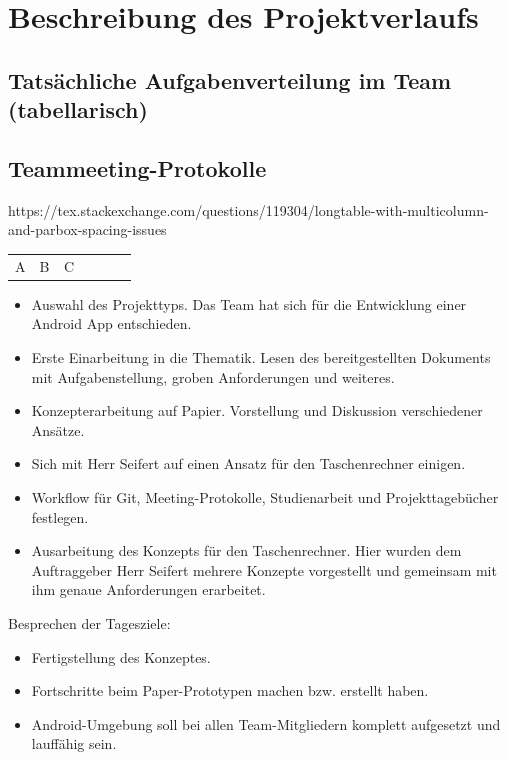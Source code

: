 \section{Beschreibung des Projektverlaufs}

\subsection{Tatsächliche Aufgabenverteilung im Team (tabellarisch)}

\subsection{Teammeeting-Protokolle}
https://tex.stackexchange.com/questions/119304/longtable-with-multicolumn-and-parbox-spacing-issues
\begin{longtable}
	{
		|p{0.2\linewidth}
		|p{0.2\linewidth}
		|p{0.6\linewidth}|
	}
	A & B & C
\end{longtable}


\begin{itemize}
	\item Auswahl des Projekttyps. Das Team hat sich für die Entwicklung einer Android  App entschieden.
	\item Erste Einarbeitung in die Thematik. Lesen des bereitgestellten Dokuments mit Aufgabenstellung, groben Anforderungen und weiteres.
	\item Konzepterarbeitung auf Papier. Vorstellung und Diskussion verschiedener Ansätze.
\end{itemize}


\begin{itemize}
	\item Sich mit Herr Seifert auf einen Ansatz für den Taschenrechner einigen.
	\item Workflow für Git, Meeting-Protokolle, Studienarbeit und Projekttagebücher festlegen.
	\item Ausarbeitung des Konzepts für den Taschenrechner. Hier wurden dem Auftraggeber Herr Seifert mehrere Konzepte vorgestellt und gemeinsam mit ihm genaue Anforderungen erarbeitet.
\end{itemize}


Besprechen der Tagesziele:

\begin{itemize}
	\item Fertigstellung des Konzeptes.
	\item Fortschritte beim Paper-Prototypen machen bzw. erstellt haben.
	\item Android-Umgebung soll bei allen Team-Mitgliedern komplett aufgesetzt und lauffähig sein.
\end{itemize}

